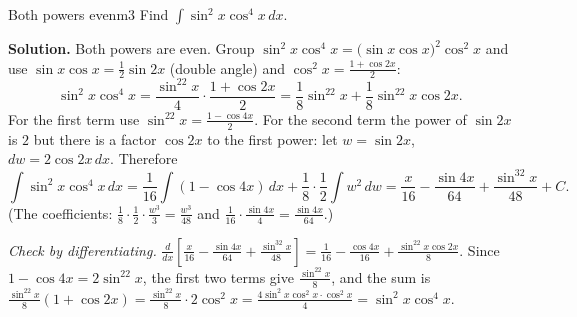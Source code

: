 \documentclass[11pt]{article}
\begin{document}
\begin{exmp}{Both powers even}{m3}
Find $\int\sin^2x\cos^4x\,dx$.

\textbf{Solution.} Both powers are even. Group $\sin^2x\cos^4x=\big(\sin x\cos x\big)^2\cos^2x$ and use $\sin x\cos x=\frac12\sin2x$ (double angle) and $\cos^2x=\frac{1+\cos2x}2$:
\[\sin^2x\cos^4x=\frac{\sin^22x}4\cdot\frac{1+\cos2x}2=\frac18\sin^22x+\frac18\sin^22x\cos2x .\]
For the first term use $\sin^22x=\frac{1-\cos4x}2$. For the second term the power of $\sin2x$ is $2$ but there is a factor $\cos2x$ to the first power: let $w=\sin2x$, $dw=2\cos2x\,dx$. Therefore
\[\int\sin^2x\cos^4x\,dx=\frac1{16}\int(1-\cos4x)\,dx+\frac18\cdot\frac12\int w^2\,dw=\frac x{16}-\frac{\sin4x}{64}+\frac{\sin^32x}{48}+C .\]
(The coefficients: $\frac18\cdot\frac12\cdot\frac{w^3}3=\frac{w^3}{48}$ and $\frac1{16}\cdot\frac{\sin4x}4=\frac{\sin4x}{64}$.)

\emph{Check by differentiating.} $\frac{d}{dx}\left[\frac x{16}-\frac{\sin4x}{64}+\frac{\sin^32x}{48}\right]=\frac1{16}-\frac{\cos4x}{16}+\frac{\sin^22x\cos2x}8$. Since $1-\cos4x=2\sin^22x$, the first two terms give $\frac{\sin^22x}8$, and the sum is $\frac{\sin^22x}8(1+\cos2x)=\frac{\sin^22x}8\cdot2\cos^2x=\frac{4\sin^2x\cos^2x\cdot\cos^2x}4=\sin^2x\cos^4x$.
\end{exmp}
\end{document}

